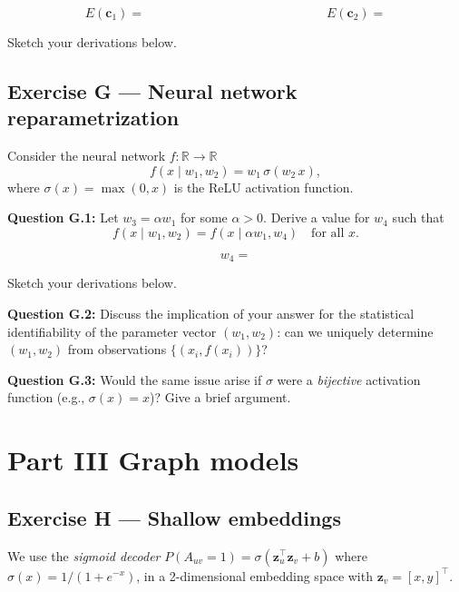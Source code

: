 \documentclass[12pt,a4paper]{article}
\begin{document}
\[
  E(\mathbf{c}_1) = \hspace{6cm} E(\mathbf{c}_2) =
\]

Sketch your derivations below.

\vspace{4cm}

\newpage
\subsection*{Exercise G --- Neural network reparametrization}

Consider the neural network $f:\mathbb{R}\to\mathbb{R}$
\[
  f(x\mid w_1, w_2) = w_1\,\sigma(w_2\, x), \tag{10}
\]
where $\sigma(x)=\max(0,x)$ is the ReLU activation function.

\textbf{Question G.1:} Let $w_3 = \alpha w_1$ for some $\alpha>0$.  Derive a value for $w_4$ such
that
\[
  f(x\mid w_1, w_2) = f(x\mid \alpha w_1, w_4) \quad \text{for all } x. \tag{11}
\]

\[
  w_4 =
\]

Sketch your derivations below.

\vspace{4cm}

\textbf{Question G.2:} Discuss the implication of your answer for the statistical identifiability
of the parameter vector $(w_1, w_2)$: can we uniquely determine $(w_1,w_2)$ from observations
$\{(x_i, f(x_i))\}$?

\vspace{4cm}

\textbf{Question G.3:} Would the same issue arise if $\sigma$ were a \emph{bijective} activation
function (e.g., $\sigma(x)=x$)?  Give a brief argument.

\vspace{3cm}

\newpage
\section*{Part III \quad Graph models}

\subsection*{Exercise H --- Shallow embeddings}

We use the \emph{sigmoid decoder}
$P(A_{uv}=1) = \sigma(\mathbf{z}_u^\top\mathbf{z}_v + b)$ where $\sigma(x)=1/(1+e^{-x})$, in
a 2-dimensional embedding space with $\mathbf{z}_v=[x,y]^\top$.
\end{document}
